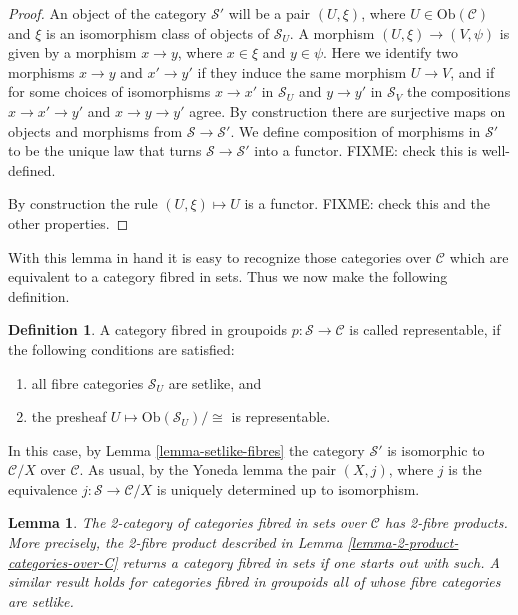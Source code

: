 \documentclass{amsart}
\newtheorem{lemma}[theorem]{Lemma}
\theoremstyle{definition}
\newtheorem{definition}[theorem]{Definition}
\theoremstyle{remark}
\numberwithin{equation}{subsection}
\begin{document}
\begin{proof}
An object of the category $\mathcal{S}'$ will be a pair $(U, \xi)$, where
$U \in \text{Ob}(\mathcal{C})$ and $\xi$ is an isomorphism class of objects
of $\mathcal{S}_U$. A morphism $(U,\xi) \to (V , \psi)$ is given by a 
morphism $x \to y$, where $x \in \xi$ and $y \in \psi$. Here we identify
two morphisms $x \to y$ and $x' \to y'$ if they induce the same morphism
$U \to V$, and if for some choices of isomorphisms $x \to x'$ in
$\mathcal{S}_U$ and $y \to y'$ in $\mathcal{S}_V$ the compositions
$x \to x' \to y'$ and $x \to y \to y'$ agree. By construction there are
surjective maps on objects and morphisms from $\mathcal{S} \to
\mathcal{S}'$. We define composition of morphisms in $\mathcal{S}'$ to
be the unique law that turns $\mathcal{S} \to \mathcal{S}'$ into a functor.
FIXME: check this is well-defined. 

\smallskip\noindent
By construction the rule $(U,\xi) \mapsto U$ is a functor. FIXME: check this
and the other properties.
\end{proof}

\noindent
With this lemma in hand it is easy to recognize those categories over
$\mathcal{C}$ which are equivalent to a category fibred in sets. Thus we
now make the following definition.

\begin{definition}
\label{definition-representable-fibred-category}
A category fibred in groupoids $p : \mathcal{S} \to \mathcal{C}$ is
called representable, if the following conditions are satisfied:
\begin{enumerate}
\item all fibre categories $\mathcal{S}_U$ are setlike, and
\item the presheaf $U \mapsto \text{Ob}(\mathcal{S}_U)/\cong$ is 
representable.
\end{enumerate}
\end{definition}

\noindent
In this case, by Lemma \ref{lemma-setlike-fibres} the category 
$\mathcal{S}'$ is isomorphic to $\mathcal{C}/X$ over $\mathcal{C}$.
As usual, by the Yoneda lemma the pair $(X,j)$, where $j$ is the
equivalence $j : \mathcal{S} \to \mathcal{C}/X$ is uniquely determined
up to isomorphism.

\begin{lemma}
\label{lemma-2-product-categories-fibred-sets}
The 2-category of categories fibred in sets over $\mathcal{C}$
has 2-fibre products. More precisely, the 2-fibre product described in 
Lemma \ref{lemma-2-product-categories-over-C} returns a category fibred in
sets if one starts out with such. A similar result holds for categories
fibred in groupoids all of whose fibre categories are setlike.
\end{lemma}
\end{document}
